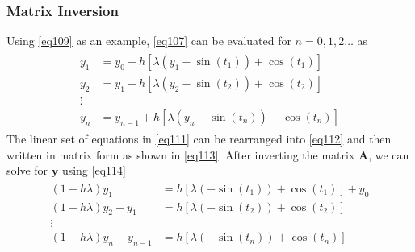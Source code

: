 \subsubsection{Matrix Inversion}
Using \cref{eq109} as an example, \cref{eq107} can be evaluated for $n = 0, 1, 2\ldots$ as
\begin{align}
\label{eq111}
\begin{aligned}
y_{1} &= y_0 + h [\lambda (y_1 - \sin(t_1)) + \cos(t_1)]\\
y_{2} &= y_1 + h [\lambda (y_2 - \sin(t_2)) + \cos(t_2)]\\
\vdots\\
y_{n} &= y_{n-1} + h [\lambda (y_n - \sin(t_n)) + \cos(t_n)]
\end{aligned}
\end{align}
The linear set of equations in \cref{eq111} can be rearranged into \cref{eq112} and then written in matrix form as shown in \cref{eq113}. After inverting the matrix $\mathbf{A}$, we can solve for $\mathbf{y}$ using \cref{eq114}
\begin{align}
\label{eq112}
\begin{aligned}
(1 - h\lambda)y_{1} &= h [\lambda (-\sin(t_1)) + \cos(t_1)] + y_0 \\
(1 - h\lambda)y_{2} - y_1 &= h [\lambda (-\sin(t_2)) + \cos(t_2)]\\ 
\vdots\\
(1 - h\lambda)y_{n} - y_{n-1} &= h [\lambda (-\sin(t_n)) + \cos(t_n)]\\
\end{aligned}
\end{align}
